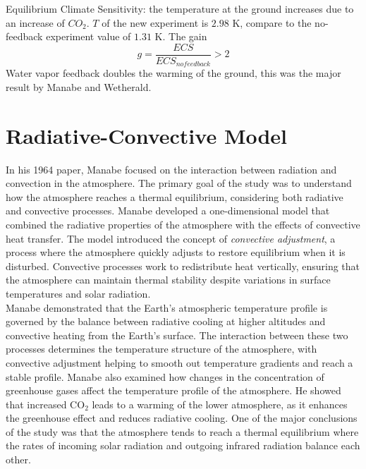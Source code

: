 Equilibrium Climate Sensitivity: the temperature at the
ground increases due to an increase of $CO_2$. $T$ of the new experiment is $2.98$ K, compare to the no-feedback experiment value of $1.31$ K. The gain
$$g=\frac{ECS}{ECS_{nofeedback}}>2$$
Water vapor feedback doubles the warming of the ground, this was the major result by Manabe and
Wetherald.
\section{Radiative-Convective Model}
In his 1964 paper, Manabe\cite{Man64} focused on the interaction between radiation and convection in the atmosphere. The primary goal of the study was to understand how the atmosphere reaches a thermal equilibrium, considering both radiative and convective processes. Manabe developed a one-dimensional model that combined the radiative properties of the atmosphere with the effects of convective heat transfer. The model introduced the concept of \textit{convective adjustment}, a process where the atmosphere quickly adjusts to restore equilibrium when it is disturbed. Convective processes work to redistribute heat vertically, ensuring that the atmosphere can maintain thermal stability despite variations in surface temperatures and solar radiation. \\

Manabe demonstrated that the Earth's atmospheric temperature profile is governed by the balance between radiative cooling at higher altitudes and convective heating from the Earth's surface. The interaction between these two processes determines the temperature structure of the atmosphere, with convective adjustment helping to smooth out temperature gradients and reach a stable profile. Manabe also examined how changes in the concentration of greenhouse gases affect the temperature profile of the atmosphere. He showed that increased CO$_2$ leads to a warming of the lower atmosphere, as it enhances the greenhouse effect and reduces radiative cooling. One of the major conclusions of the study was that the atmosphere tends to reach a thermal equilibrium where the rates of incoming solar radiation and outgoing infrared radiation balance each other.




